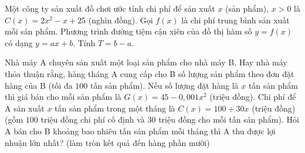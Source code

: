 \begin{bt}%
	Một công ty sản xuất đồ chơi ước tính chi phí để sản xuất $x$ (sản phẩm), $x>0$ là $C(x)=2x^2-x+25$ (nghìn đồng). Gọi $f(x)$ là chi phí trung bình sản xuất mỗi sản phẩm. Phương trình đường tiệm cận xiên của đồ thị hàm số $y=f(x)$ có dạng $y=ax+b$. Tính $T=b-a$.
\end{bt}

\begin{bt}%
	Nhà máy A chuyên sản xuất một loại sản phẩm cho nhà máy B. Hay nhà máy thỏa thuận rằng, hàng tháng A cung cấp cho B số lượng sản phẩm theo đơn đặt hàng của B (tối đa $100$ tấn sản phẩm). Nếu số lượng đặt hàng là $x$ tấn sản phẩm thì giá bán cho mỗi sản phẩm là $G(x)=45-0{,}001x^2$ (triệu đồng). Chi phí để A sản xuất $x$ tấn sản phẩm trong một tháng là $C(x)=100+30x$ (triệu đồng) (gồm $100$ triệu đồng chi phí cố định và $30$ triệu đồng cho mỗi tấn sản phẩm). Hỏi A bán cho B khoảng bao nhiêu tấn sản phẩm mỗi tháng thì A thu được lợi nhuận lớn nhất? (làm tròn kết quả đến hàng phần mười)
\end{bt}

